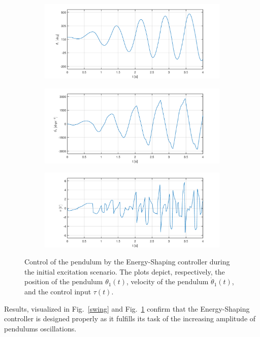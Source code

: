 \begin{figure}[H]
	\centering
	\begin{subfigure}
		\centering
		\includegraphics[scale=0.6]{images/swings/pend.pdf}  
	\end{subfigure}
	\begin{subfigure}
		\centering
		\includegraphics[scale=0.6]{images/swings/dpend.pdf}  
	\end{subfigure}
	\begin{subfigure}
		\centering
		\includegraphics[scale=0.6]{images/swings/control.pdf}  
	\end{subfigure}
	\caption{Control of the pendulum by the Energy-Shaping controller during the initial excitation scenario. The plots depict, respectively, the position of the pendulum $\theta_1(t)$, velocity of the pendulum $\dot{\theta}_1(t)$, and the control input $\tau(t)$.}
	\label{swing1}
\end{figure}
Results, visualized in Fig.~\ref{swing} and Fig.~\ref{swing1} confirm that the Energy-Shaping controller is designed properly as it fulfills its task of the increasing amplitude of pendulums oscillations.
